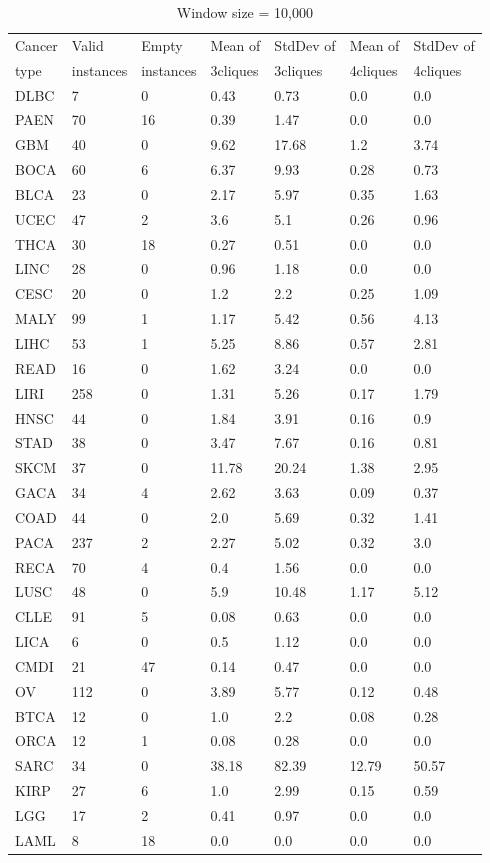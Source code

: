 \documentclass[a4paper,10pt]{article}
\begin{document}
\begin{table}[]
\centering
\caption{Window size = 10,000}
\label{my-label}
\begin{tabular}{l|l|l|l|l|l|l}
Cancer & Valid & Empty & Mean of & StdDev of& Mean of & StdDev of \\ 
type & instances  & instances & 3cliques & 3cliques & 4cliques & 4cliques \\ \hline 
DLBC&7&0&0.43&0.73&0.0&0.0\\
PAEN&70&16&0.39&1.47&0.0&0.0\\
GBM&40&0&9.62&17.68&1.2&3.74\\
BOCA&60&6&6.37&9.93&0.28&0.73\\
BLCA&23&0&2.17&5.97&0.35&1.63\\
UCEC&47&2&3.6&5.1&0.26&0.96\\
THCA&30&18&0.27&0.51&0.0&0.0\\
LINC&28&0&0.96&1.18&0.0&0.0\\
CESC&20&0&1.2&2.2&0.25&1.09\\
MALY&99&1&1.17&5.42&0.56&4.13\\
LIHC&53&1&5.25&8.86&0.57&2.81\\
READ&16&0&1.62&3.24&0.0&0.0\\
LIRI&258&0&1.31&5.26&0.17&1.79\\
HNSC&44&0&1.84&3.91&0.16&0.9\\
STAD&38&0&3.47&7.67&0.16&0.81\\
SKCM&37&0&11.78&20.24&1.38&2.95\\
GACA&34&4&2.62&3.63&0.09&0.37\\
COAD&44&0&2.0&5.69&0.32&1.41\\
PACA&237&2&2.27&5.02&0.32&3.0\\
RECA&70&4&0.4&1.56&0.0&0.0\\
LUSC&48&0&5.9&10.48&1.17&5.12\\
CLLE&91&5&0.08&0.63&0.0&0.0\\
LICA&6&0&0.5&1.12&0.0&0.0\\
CMDI&21&47&0.14&0.47&0.0&0.0\\
OV&112&0&3.89&5.77&0.12&0.48\\
BTCA&12&0&1.0&2.2&0.08&0.28\\
ORCA&12&1&0.08&0.28&0.0&0.0\\
SARC&34&0&38.18&82.39&12.79&50.57\\
KIRP&27&6&1.0&2.99&0.15&0.59\\
LGG&17&2&0.41&0.97&0.0&0.0\\
LAML&8&18&0.0&0.0&0.0&0.0\\

\end{tabular}
\end{table}
\end{document}
